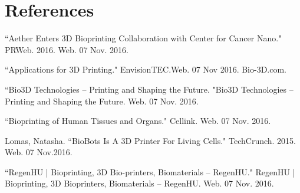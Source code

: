 \chapter{References}

\begin{hangparas}{1cm}{1}
``Aether Enters 3D Bioprinting Collaboration with Center for Cancer Nano." PRWeb. 2016. Web. 07 Nov. 2016.


``Applications for 3D Printing." EnvisionTEC.Web. 07 Nov 2016.
Bio-3D.com. 


``Bio3D Technologies – Printing and Shaping the Future. "Bio3D Technologies – Printing and Shaping the Future. Web. 07 Nov. 2016.


``Bioprinting of Human Tissues and Organs." Cellink. Web. 07 Nov. 2016.


Lomas, Natasha. ``BioBots Is A 3D Printer For Living Cells." TechCrunch. 2015. Web. 07 Nov.2016. 


``RegenHU | Bioprinting, 3D Bio-printers, Biomaterials – RegenHU." RegenHU | Bioprinting, 3D Bioprinters, Biomaterials – RegenHU. Web. 07 Nov. 2016.
\end{hangparas}